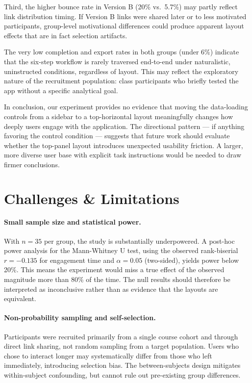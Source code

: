 \documentclass{article}
\begin{document}
Third, the higher bounce rate in Version B (20\% vs.\ 5.7\%) may partly reflect link distribution timing. If Version B links were shared later or to less motivated participants, group-level motivational differences could produce apparent layout effects that are in fact selection artifacts.

The very low completion and export rates in both groups (under 6\%) indicate that the six-step workflow is rarely traversed end-to-end under naturalistic, uninstructed conditions, regardless of layout. This may reflect the exploratory nature of the recruitment population: class participants who briefly tested the app without a specific analytical goal.

In conclusion, our experiment provides no evidence that moving the data-loading controls from a sidebar to a top-horizontal layout meaningfully changes how deeply users engage with the application. The directional pattern --- if anything favoring the control condition --- suggests that future work should evaluate whether the top-panel layout introduces unexpected usability friction. A larger, more diverse user base with explicit task instructions would be needed to draw firmer conclusions.

\section{Challenges \& Limitations}

\paragraph{Small sample size and statistical power.}
With $n = 35$ per group, the study is substantially underpowered. A post-hoc power analysis for the Mann-Whitney U test, using the observed rank-biserial $r = -0.135$ for engagement time and $\alpha = 0.05$ (two-sided), yields power below 20\%. This means the experiment would miss a true effect of the observed magnitude more than 80\% of the time. The null results should therefore be interpreted as inconclusive rather than as evidence that the layouts are equivalent.

\paragraph{Non-probability sampling and self-selection.}
Participants were recruited primarily from a single course cohort and through direct link sharing, not random sampling from a target population. Users who chose to interact longer may systematically differ from those who left immediately, introducing selection bias. The between-subjects design mitigates within-subject confounding, but cannot rule out pre-existing group differences.
\end{document}
